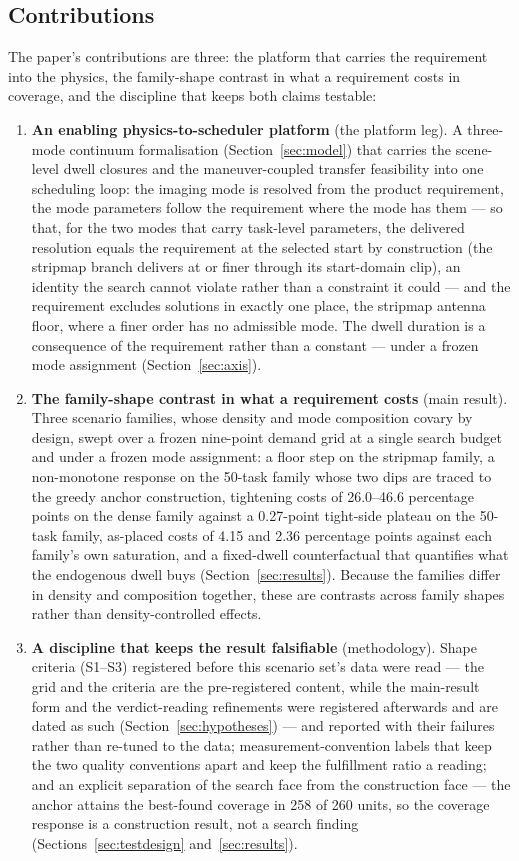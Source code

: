 \documentclass[preprint,authoryear]{elsarticle}
\begin{document}
\subsection{Contributions}

The paper's contributions are three: the platform that carries the requirement into the physics, the family-shape contrast in what a requirement costs in coverage, and the discipline that keeps both claims testable:
\begin{enumerate}
\item \textbf{An enabling physics-to-scheduler platform} (the platform leg). A three-mode continuum formalisation (Section~\ref{sec:model}) that carries the scene-level dwell closures and the maneuver-coupled transfer feasibility into one scheduling loop: the imaging mode is resolved from the product requirement, the mode parameters follow the requirement where the mode has them --- so that, for the two modes that carry task-level parameters, the delivered resolution equals the requirement at the selected start by construction (the stripmap branch delivers at or finer through its start-domain clip), an identity the search cannot violate rather than a constraint it could --- and the requirement excludes solutions in exactly one place, the stripmap antenna floor, where a finer order has no admissible mode. The dwell duration is a consequence of the requirement rather than a constant --- under a frozen mode assignment (Section~\ref{sec:axis}).
\item \textbf{The family-shape contrast in what a requirement costs} (main result). Three scenario families, whose density and mode composition covary by design, swept over a frozen nine-point demand grid at a single search budget and under a frozen mode assignment: a floor step on the stripmap family, a non-monotone response on the 50-task family whose two dips are traced to the greedy anchor construction, tightening costs of 26.0--46.6 percentage points on the dense family against a 0.27-point tight-side plateau on the 50-task family, as-placed costs of 4.15 and 2.36 percentage points against each family's own saturation, and a fixed-dwell counterfactual that quantifies what the endogenous dwell buys (Section~\ref{sec:results}). Because the families differ in density and composition together, these are contrasts across family shapes rather than density-controlled effects.
\item \textbf{A discipline that keeps the result falsifiable} (methodology). Shape criteria (S1--S3) registered before this scenario set's data were read --- the grid and the criteria are the pre-registered content, while the main-result form and the verdict-reading refinements were registered afterwards and are dated as such (Section~\ref{sec:hypotheses}) --- and reported with their failures rather than re-tuned to the data; measurement-convention labels that keep the two quality conventions apart and keep the fulfillment ratio a reading; and an explicit separation of the search face from the construction face --- the anchor attains the best-found coverage in 258 of 260 units, so the coverage response is a construction result, not a search finding (Sections~\ref{sec:testdesign} and~\ref{sec:results}).
\end{enumerate}
\end{document}
